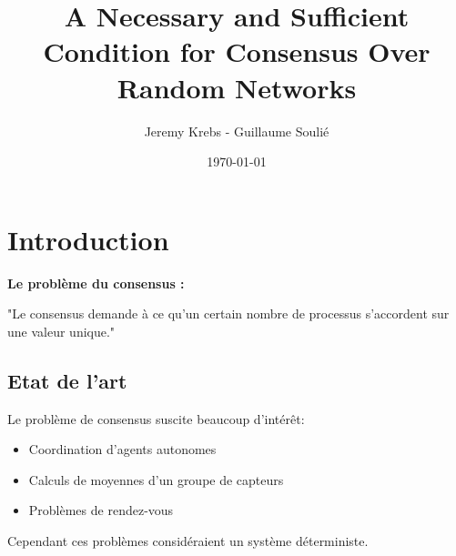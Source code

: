 \documentclass{beamer}
\title{A Necessary and Sufficient Condition for
Consensus Over Random Networks}
\author{Jeremy Krebs - Guillaume Soulié}
\institute{Université Paris Saclay}
\date{\today}
\begin{document}
\begin{frame}
\titlepage
\end{frame}

\begin{frame}
  \tableofcontents
\end{frame}      


\section{Introduction}
\begin{frame}
	\textbf{Le problème du consensus :}

	"Le consensus demande à ce qu'un certain nombre de processus s'accordent sur une valeur unique."
	\begin{center}
	\end{center}
\end{frame}


\begin{frame}
	\tableofcontents
\end{frame}

\subsection{Etat de l'art}
\begin{frame}
		Le problème de consensus suscite beaucoup d'intérêt:
		 \begin{itemize}
		 	\item Coordination d'agents autonomes
		 	\pause
		 	\item Calculs de moyennes d'un groupe de capteurs
		 	\pause
		 	\item Problèmes de rendez-vous
		 \end{itemize}
		 
		 \pause
		 
		 Cependant ces problèmes considéraient un système déterministe.
\end{frame}		
\end{document}
